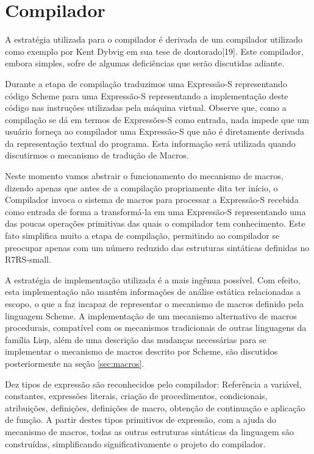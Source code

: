 \section{Compilador}
\label{sec:compilador}

A estratégia utilizada para o compilador é derivada de um compilador utilizado como exemplo por Kent Dybvig em sua tese de doutorado[19]. Este compilador, embora simples, sofre de algumas deficiências que serão discutidas adiante.

Durante a etapa de compilação traduzimos uma Expressão-S representando código Scheme para uma Expressão-S representando a implementação deste código nas instruções utilizadas pela máquina virtual. Observe que, como a compilação se dá em termos de Expressões-S como entrada, nada impede que um usuário forneça ao compilador uma Expressão-S que não é diretamente derivada da representação textual do programa. Esta informação será utilizada quando discutirmos o mecanismo de tradução de Macros.

Neste momento vamos abstrair o funcionamento do mecanismo de macros, dizendo apenas que antes de a compilação propriamente dita ter início, o Compilador invoca o sistema de macros para processar a Expressão-S recebida como entrada de forma a transformá-la em uma Expressão-S representando uma das poucas operações primitivas das quais o compilador tem conhecimento. Este fato simplifica muito a etapa de compilação, permitindo ao compilador se preocupar apenas com um número reduzido das estruturas sintáticas definidas no R7RS-small.

A estratégia de implementação utilizada é a mais ingênua possível. Com efeito, esta implementação não mantém informações de análise estática relacionadas a escopo, o que a faz incapaz de representar o mecanismo de macros definido pela linguagem Scheme. A implementação de um mecanismo alternativo de macros procedurais, compatível com os mecanismos tradicionais de outras linguagens da família Lisp, além de uma descrição das mudanças necessárias para se implementar o mecanismo de macros descrito por Scheme, são discutidos posteriormente na seção \ref{sec:macros}.

Dez tipos de expressão são reconhecidos pelo compilador: Referência a variável, constantes,  expressões literais, criação de procedimentos, condicionais, atribuições, definições, definições de macro, obtenção de continuação e aplicação de função. A partir destes tipos primitivos de expressão, com a ajuda do mecanismo de macros, todas as outras estruturas sintáticas da linguagem são construídas, simplificando significativamente o projeto do compilador.

